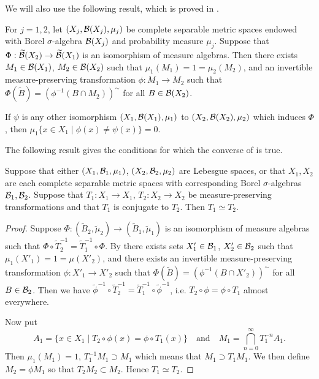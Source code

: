 We will also use the following result, which is proved in \cite[Theorem 12]{royden:real-analysis}.

\begin{lemma} \label{lem:walters-thm-2-2}
	For $j = 1, 2$, let $(X_j, \mathcal{B}(X_j), \mu_j)$ be complete separable metric spaces endowed with Borel $\sigma$-algebra $\mathcal{B}(X_j)$ and probability measure $\mu_j$. Suppose that $\Phi: \widetilde{\mathcal{B}}(X_2) \to \widetilde{\mathcal{B}}(X_1)$ is an isomorphism of measure algebras. Then there exists $M_1 \in \mathcal{B}(X_1)$, $M_2 \in \mathcal{B}(X_2)$ such that $\mu_1(M_1) = 1 = \mu_2(M_2)$, and an invertible measure-preserving transformation $\phi: M_1 \to M_2$ such that $\Phi(\tilde{B}) = (\phi^{-1}(B \cap M_2))^\sim$ for all $B \in \mathcal{B}(X_2)$.
	
	If $\psi$ is any other isomorphism $(X_1, \mathcal{B}(X_1), \mu_1)$ to $(X_2, \mathcal{B}(X_2), \mu_2)$ which induces $\Phi$, then $\mu_1\{x \in X_1 \mid \phi(x) \neq \psi(x)\} = 0$.
\end{lemma}

The following result gives the conditions for which the converse of  is true.

\begin{theorem} \label{thm:walters-2-6}
	Suppose that either $(X_1, \mathcal{B}_1, \mu_1)$, $(X_2, \mathcal{B}_2, \mu_2)$ are Lebesgue spaces, or that $X_1, X_2$ are each complete separable metric spaces with corresponding Borel $\sigma$-algebras $\mathcal{B}_1, \mathcal{B}_2$. Suppose that $T_1 : X_1 \to X_1$, $T_2 : X_2 \to X_2$ be measure-preserving transformations and that $T_1$ is conjugate to $T_2$. Then $T_1 \simeq T_2$.
	\begin{proof}
		Suppose $\Phi : (\tilde{B}_2, \tilde{\mu}_2) \to (\tilde{B}_1, \tilde{\mu}_1)$ is an isomorphism of measure algebras such that $\Phi \circ \tilde{T}_2^{-1} = \tilde{T}_1^{-1} \circ \Phi$. By  there exists sets $X'_1 \in \mathcal{B}_1$, $X'_2 \in \mathcal{B}_2$ such that $\mu_1(X'_1) = 1 = \mu(X'_2)$, and there exists an invertible measure-preserving transformation $\phi : X'_1 \to X'_2$ such that $\Phi(\tilde{B}) = (\phi^{-1}(B \cap X'_2))^\sim$ for all $B \in \mathcal{B}_2$. Then we have $\tilde{\phi}^{-1} \circ \tilde{T}_2^{-1} = \tilde{T}_1^{-1} \circ \tilde{\phi}^{-1}$, i.e. $T_2 \circ \phi = \phi \circ T_1$ almost everywhere.
		
		Now put
		\[
			A_1 = \{x \in X_1 \mid T_2 \circ \phi(x) = \phi \circ T_1(x)\} \quad \text{and} \quad M_1 = \bigcap_{n = 0}^\infty{T_1^{-n}{A_1}}.
		\]
		Then $\mu_1(M_1) = 1$, $T_1^{-1}{M_1} \supset M_1$ which means that $M_1 \supset T_1 M_1$. We then define $M_2 = \phi M_1$ so that $T_2 M_2 \subset M_2$. Hence $T_1 \simeq T_2$.
	\end{proof}
\end{theorem}


